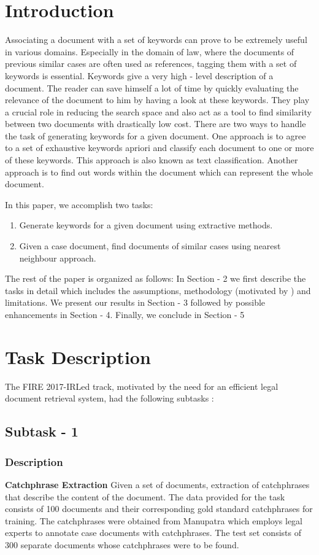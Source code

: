 \section{Introduction}

Associating a document with a set of keywords can prove to be extremely useful in various domains. Especially in the domain of law, where the documents of previous similar cases are often used as references, tagging them with a set of keywords is essential. Keywords give a very high - level description of a document. The reader can save himself a lot of time by quickly evaluating the relevance of the document to him by having a look at these keywords. They play a crucial role in reducing the search space and also act as a tool to find similarity between two documents with drastically low cost. There are two ways to handle the task of generating keywords for a given document. One approach is to agree to a set of exhaustive keywords apriori and classify each document to one or more of these keywords. This approach is also known as text classification. Another approach is to find out words within the document which can represent the whole document.

In this paper, we accomplish two tasks:
\begin{enumerate}
	\item Generate keywords for a given document using extractive methods.
	\item Given a case document, find documents of similar cases using nearest neighbour approach.
\end{enumerate}

The rest of the paper is organized as follows: In Section - 2 we first describe the tasks in detail which includes the assumptions, methodology (motivated by \cite{galgani2012towards}) and limitations. We present our results in Section - 3 followed by possible enhancements in Section - 4. Finally, we conclude in Section - 5
\section{Task Description}
The FIRE 2017-IRLed track, motivated by the need for an efficient legal document retrieval system, had the following subtasks :
\subsection{Subtask - 1}
\subsubsection{Description}
\textbf{Catchphrase Extraction} Given a set of documents, extraction of catchphrases that describe the content of the document. The data provided for the task consists of 100 documents and their corresponding gold standard catchphrases for training. The catchphrases were obtained from Manupatra which employs legal experts to annotate case documents with catchphrases. The test set consists of 300 separate documents whose catchphrases were to be found.


